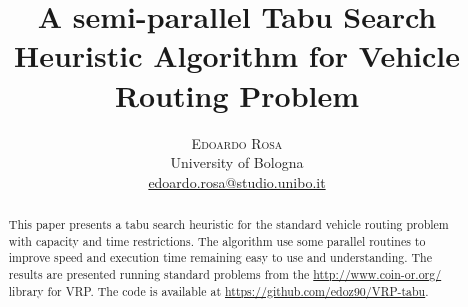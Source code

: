 \documentclass[twoside]{article}
\title{\vspace{-15mm}\fontsize{24pt}{10pt}\selectfont\textbf{A semi-parallel Tabu Search Heuristic Algorithm for Vehicle Routing Problem}} %
\author{
\large
\textsc{Edoardo Rosa}\\[2mm] %
\normalsize University of Bologna \\ %
\normalsize \href{mailto:edoardo.rosa@studio.unibo.it}{edoardo.rosa@studio.unibo.it} %
\vspace{-5mm}
}
\date{}
\begin{document}
\maketitle %

\thispagestyle{fancy} %


\begin{abstract}

\noindent %
This paper presents a tabu search heuristic for the standard vehicle routing problem with capacity and time restrictions. The algorithm use some parallel routines to improve speed and execution time remaining easy to use and understanding.
The results are presented running standard problems from the \url{http://www.coin-or.org/} library for VRP.
\noindent\newline
The code is available at \url{https://github.com/edoz90/VRP-tabu}.
\end{abstract}

\end{document}
